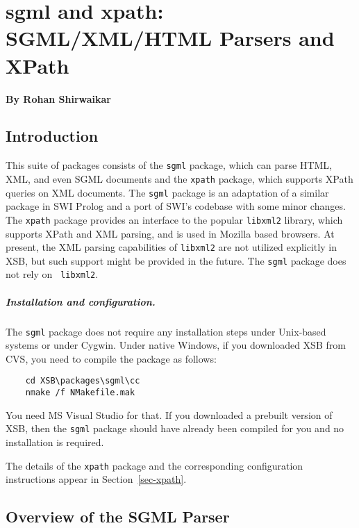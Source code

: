 
\chapter{sgml and xpath: SGML/XML/HTML Parsers and XPath}

  \begin{center}
    {\Large {\bf By Rohan Shirwaikar}}
  \end{center}



\section{Introduction}
This suite of packages consists of the {\tt sgml} package, which can parse
HTML, XML, and even SGML documents and the {\tt xpath} package, which
supports XPath queries on XML documents.  The {\tt sgml} package is an
adaptation of a similar package in SWI Prolog and a port of SWI's codebase with
some minor changes. The {\tt xpath} package provides an interface to the
popular {\tt libxml2} library, which supports XPath and XML parsing, and is
used in Mozilla based browsers. At present, the XML parsing capabilities of
{\tt libxml2} are not utilized explicitly in XSB, but such support might be
provided in the future. The {\tt sgml} package does not rely on {\tt
  libxml2}.

\paragraph{Installation and configuration.}
The {\tt sgml} package does not require any installation steps under
Unix-based systems or under Cygwin. Under native Windows, if you downloaded XSB
from CVS, you need to compile the package as follows:
\begin{verbatim}
    cd XSB\packages\sgml\cc
    nmake /f NMakefile.mak
\end{verbatim}
You need MS Visual Studio for that. If you downloaded a prebuilt version
of XSB, then the {\tt sgml}  package should have already been compiled for you
and no installation is required.

The details of the {\tt xpath} package and the corresponding configuration
instructions appear in Section~\ref{sec-xpath}.

\section{Overview of the SGML Parser}

